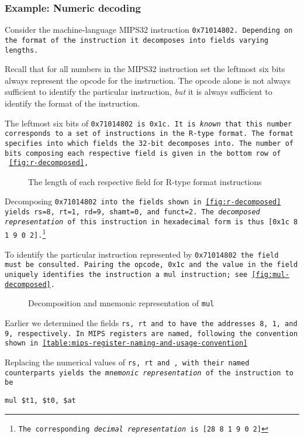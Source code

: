 \subsubsection{Example: Numeric decoding}\label{sec:example-numeric-decoding}

Consider the machine-language MIPS32 instruction \tt{0x71014802}.
Depending on the format of the instruction it decomposes into fields
varying lengths.

Recall that for all numbers in the MIPS32 instruction set the leftmost
six bits always represent the opcode for the instruction. The opcode
alone is not always sufficient to identify the particular instruction,
\emph{but} it is always sufficient to identify the format of the
instruction.

The leftmost six bits of \tt{0x71014802} is \tt{0x1c}. It is
\emph{known} that this number corresponds to a set of instructions in
the R-type format. The format specifies into which fields the 32-bit
decomposes into. The number of bits composing each respective field is
given in the bottom row of ~\autoref{fig:r-decomposed},

\begin{figure}[H]
\centering

\caption{The length of each respective field for R-type format instructions}
\label{fig:r-decomposed}
\end{figure}

Decomposing \tt{0x71014802} into the fields shown in
\autoref{fig:r-decomposed} yields \tt{rs=8}, \tt{rt=1}, \tt{rd=9},
\tt{shamt=0}, and \tt{funct=2}. The \emph{decomposed representation}
of this instruction in hexadecimal form is thus \tt{[0x1c 8 1 9 0
  2]}.\footnote{The corresponding \emph{decimal representation} is
  \tt{[28 8 1 9 0 2]}}

To identify the particular instruction represented by \tt{0x71014802}
the \funct{} field must be consulted. Pairing the opcode, \tt{0x1c}
and the value in the \funct{} field uniquely identifies the
instruction a \tt{mul} instruction; see \autoref{fig:mul-decomposed}.

\begin{figure}[H]
  \centering
  
  \caption{Decomposition and mnemonic representation of \tt{mul}}
  \label{fig:mul-decomposed}
\end{figure}

Earlier we determined the fields \tt{rs}, \tt{rt} and \rd{} to have
the addresses 8, 1, and 9, respectively. In MIPS registers are named,
following the convention shown in
\autoref{table:mips-register-naming-and-usage-convention}

Replacing the numerical values of \tt{rs}, \tt{rt} and \rd{}, with
their named counterparts yields the \emph{mnemonic representation} of
the instruction to be

\begin{lstlisting}[style=mips_lst]
mul $t1, $t0, $at
\end{lstlisting}
